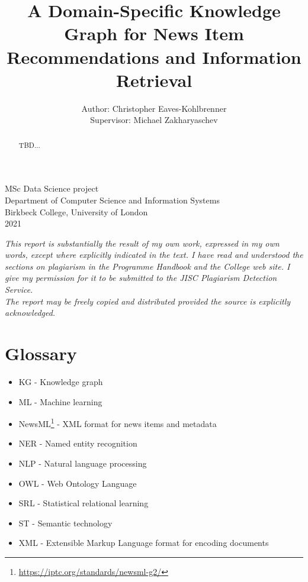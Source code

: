 \documentclass[11pt]{article}
\title{A Domain-Specific Knowledge Graph for News Item Recommendations and Information Retrieval}
\author{Author: Christopher Eaves-Kohlbrenner \\ Supervisor: Michael Zakharyaschev}
\begin{document}
\maketitle

\begin{center}
\hfill \break
\hfill \break
\hfill \break
MSc Data Science project\\
Department of Computer Science and Information Systems\\
Birkbeck College, University of London\\
2021\\
\hfill \break
\hfill \break
\hfill \break

\textit{This report is substantially the result of my own work, expressed in my own words, except where explicitly indicated in the text. I have read and understood the sections on plagiarism in the Programme Handbook and the College web site. I give my permission for it to be submitted to the JISC Plagiarism Detection Service. \\
\hfill \break
The report may be freely copied and distributed provided the source is explicitly acknowledged.}
\end{center}


\newpage
\begin{abstract}
TBD...
\end{abstract}

\newpage
\tableofcontents

\newpage
\section{Glossary}
\begin{itemize}
\item KG - Knowledge graph
\item ML - Machine learning
\item NewsML\footnote{\url{https://iptc.org/standards/newsml-g2/}} - XML format for news items and metadata
\item NER - Named entity recognition
\item NLP - Natural language processing
\item OWL - Web Ontology Language
\item SRL - Statistical relational learning
\item ST - Semantic technology
\item XML - Extensible Markup Language format for encoding documents
\end{itemize}
\end{document}

